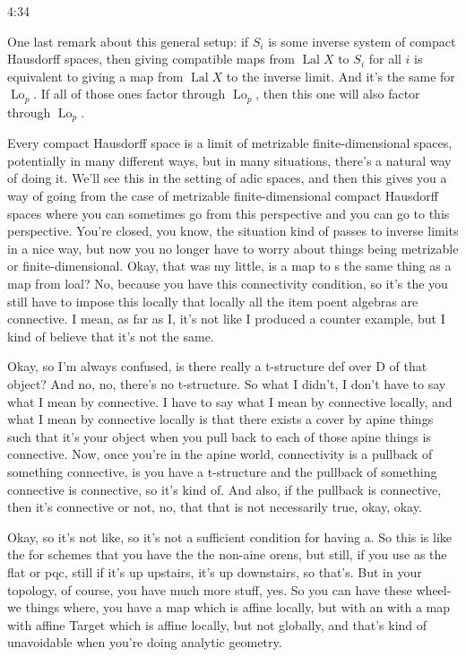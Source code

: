 \begin{unfinished}{4:34}
\begin{example}
One last remark about this general setup: if $S_i$ is some inverse system of compact Hausdorff spaces, then giving compatible maps from $\operatorname{Lal} X$ to $S_i$ for all $i$ is equivalent to giving a map from $\operatorname{Lal} X$ to the inverse limit. And it's the same for $\operatorname{Lo}_p$. If all of those ones factor through $\operatorname{Lo}_p$, then this one will also factor through $\operatorname{Lo}_p$.

Every compact Hausdorff space is a limit of metrizable finite-dimensional spaces, potentially in many different ways, but in many situations, there's a natural way of doing it. We'll see this in the setting of adic spaces, and then this gives you a way of going from the case of metrizable finite-dimensional compact Hausdorff spaces where you can sometimes go from this perspective and you can go to this perspective.
You're closed, you know, the situation kind of passes to inverse limits in a nice way, but now you no longer have to worry about things being metrizable or finite-dimensional. Okay, that was my little, is a map to s the same thing as a map from loal? No, because you have this connectivity condition, so it's the you still have to impose this locally that locally all the item poent algebras are connective. I mean, as far as I, it's not like I produced a counter example, but I kind of believe that it's not the same.

Okay, so I'm always confused, is there really a t-structure def over D of that object? And no, no, there's no t-structure. So what I didn't, I don't have to say what I mean by connective. I have to say what I mean by connective locally, and what I mean by connective locally is that there exists a cover by apine things such that it's your object when you pull back to each of those apine things is connective. Now, once you're in the apine world, connectivity is a pullback of something connective, is you have a t-structure and the pullback of something connective is connective, so it's kind of. And also, if the pullback is connective, then it's connective or not, no, that that is not necessarily true, okay, okay.

Okay, so it's not like, so it's not a sufficient condition for having a. So this is like the for schemes that you have the the non-aine orens, but still, if you use as the flat or pqc, still if it's up upstairs, it's up downstairs, so that's. But in your topology, of course, you have much more stuff, yes. So you can have these wheel-we things where, you have a map which is affine locally, but with an with a map with affine Target which is affine locally, but not globally, and that's kind of unavoidable when you're doing analytic geometry.


\end{example}
\end{unfinished}

